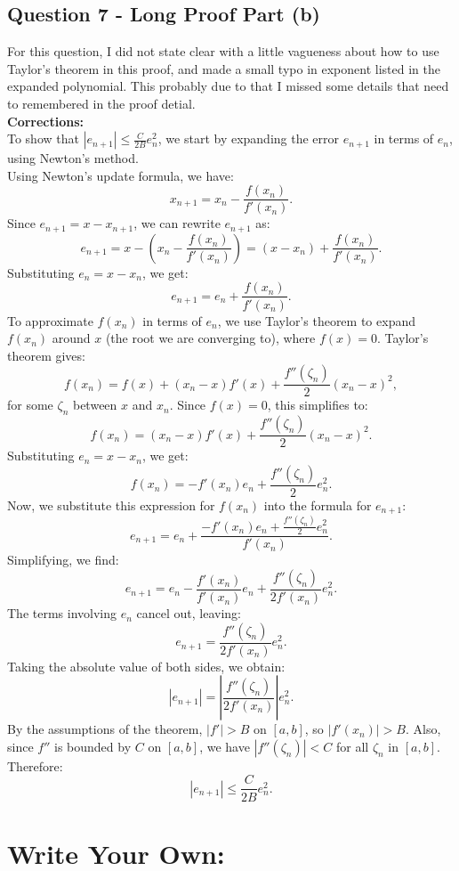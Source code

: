 \documentclass[12pt]{article}
\begin{document}
\subsection*{Question 7 - Long Proof Part (b)}
For this question, I did not state clear with a little vagueness about how to use Taylor's theorem in this proof, and made a small typo in exponent listed in the expanded polynomial. 
This probably due to that I missed some details that need to remembered in the proof detial.
\\
\textbf{Corrections: }
\\
To show that \( |e_{n+1}| \leq \frac{C}{2B} e_n^2 \), we start by expanding the error \( e_{n+1} \) in terms of \( e_n \), using Newton’s method.
\\
Using Newton's update formula, we have:
\[
   x_{n+1} = x_n - \frac{f(x_n)}{f'(x_n)}.
\]
Since \( e_{n+1} = x - x_{n+1} \), we can rewrite \( e_{n+1} \) as:
\[
   e_{n+1} = x - \left( x_n - \frac{f(x_n)}{f'(x_n)} \right) = (x - x_n) + \frac{f(x_n)}{f'(x_n)}.
\]
Substituting \( e_n = x - x_n \), we get:
\[
   e_{n+1} = e_n + \frac{f(x_n)}{f'(x_n)}.
\]
To approximate \( f(x_n) \) in terms of \( e_n \), we use Taylor’s theorem to expand \( f(x_n) \) around \( x \) (the root we are converging to), where \( f(x) = 0 \). Taylor’s theorem gives:
\[
   f(x_n) = f(x) + (x_n - x) f'(x) + \frac{f''(\zeta_n)}{2} (x_n - x)^2,
\]
for some \( \zeta_n \) between \( x \) and \( x_n \). Since \( f(x) = 0 \), this simplifies to:
\[
   f(x_n) = (x_n - x) f'(x) + \frac{f''(\zeta_n)}{2} (x_n - x)^2.
\]
Substituting \( e_n = x - x_n \), we get:
\[
   f(x_n) = -f'(x_n) e_n + \frac{f''(\zeta_n)}{2} e_n^2.
\]
Now, we substitute this expression for \( f(x_n) \) into the formula for \( e_{n+1} \):
\[
   e_{n+1} = e_n + \frac{-f'(x_n) e_n + \frac{f''(\zeta_n)}{2} e_n^2}{f'(x_n)}.
\]
Simplifying, we find:
\[
   e_{n+1} = e_n - \frac{f'(x_n)}{f'(x_n)} e_n + \frac{f''(\zeta_n)}{2 f'(x_n)} e_n^2.
\]
The terms involving \( e_n \) cancel out, leaving:
\[
   e_{n+1} = \frac{f''(\zeta_n)}{2 f'(x_n)} e_n^2.
\]
Taking the absolute value of both sides, we obtain:
\[
   |e_{n+1}| = \left| \frac{f''(\zeta_n)}{2 f'(x_n)} \right| e_n^2.
\]
By the assumptions of the theorem, \( |f'| > B \) on \( [a, b] \), so \( |f'(x_n)| > B \). Also, since \( f'' \) is bounded by \( C \) on \( [a, b] \), we have \( |f''(\zeta_n)| < C \) for all \( \zeta_n \) in \( [a, b] \). Therefore:
\[
   |e_{n+1}| \leq \frac{C}{2B} e_n^2.
\]

\section*{Write Your Own: }
\end{document}
